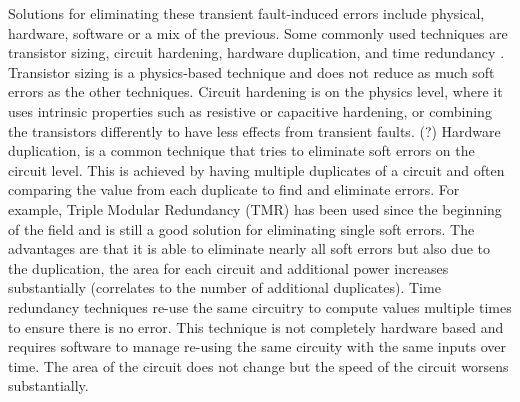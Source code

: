 \documentclass[12pt]{report}
\begin{document}
Solutions for eliminating these transient fault-induced errors include physical, hardware, software or a mix of the previous. Some commonly used techniques are transistor sizing, circuit hardening, hardware duplication, and time redundancy \cite{Mitra_08_softerrors}. Transistor sizing is a physics-based technique and does not reduce as much soft errors as the other techniques. Circuit hardening is on the physics level, where it uses intrinsic properties such as resistive or capacitive hardening, or combining the transistors differently to have less effects from transient faults. (?) Hardware duplication, is a common technique that tries to eliminate soft errors on the circuit level. This is achieved by having multiple duplicates of a circuit and often comparing the value from each duplicate to find and eliminate errors. For example, Triple Modular Redundancy (TMR) has been used since the beginning of the field and is still a good solution for eliminating single soft errors. The advantages are that it is able to eliminate nearly all soft errors but also due to the duplication, the area for each circuit and additional power increases substantially (correlates to the number of additional duplicates). Time redundancy techniques re-use the same circuitry to compute values multiple times to ensure there is no error. This technique is not completely hardware based and requires software to manage re-using the same circuity with the same inputs over time. The area of the circuit does not change but the speed of the circuit worsens substantially. \\
\end{document}

